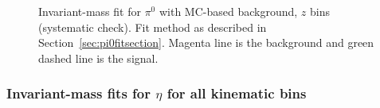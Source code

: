 \begin{figure}[H]
\label{fig:pi0zfit2}
\caption[Invariant-mass fit for $\pi^0$ with MC-based background, $z$ bins]{Invariant-mass fit for $\pi^0$ with MC-based background, $z$ bins (systematic check). Fit method as described in Section~\ref{sec:pi0fitsection}. Magenta line is the background and green dashed line is the signal.}
\end{figure}


\subsubsection{\texorpdfstring{Invariant-mass fits for $\eta$ for all kinematic bins}{Invariant-mass fits for eta for all kinematic bins}}


